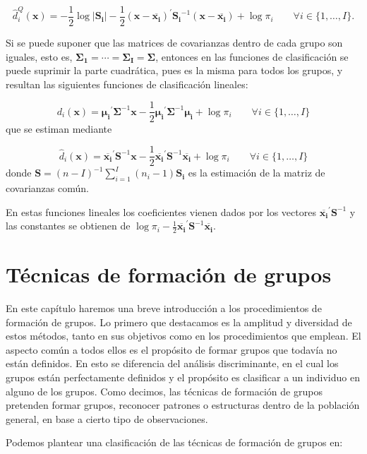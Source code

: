 \documentclass[
  a4paper,
  oneside]{scrbook}
\theoremstyle{definition}
\theoremstyle{definition}
\theoremstyle{definition}
\theoremstyle{definition}
\theoremstyle{remark}
\begin{document}
\[\hat{d}_i^Q(\bm{x})=-\frac{1}{2}\log \left|\bm{S_i}\right|
 -\frac{1}{2}\left(\bm{x}-\overline{\bm{x_{i}}}\right)^\prime{}\bm{S_i}^{-1}\left(\bm{x}-\overline{\bm{x_{i}}}\right)
+\log \pi_i\qquad\forall i\in\{1,\ldots,I\}.\]

Si se puede suponer que las matrices de covarianzas dentro de cada grupo
son iguales, esto es, \(\bm{\Sigma_1}=\cdots=\bm{\Sigma_I}=\bm\Sigma\),
entonces en las funciones de clasificación se puede suprimir la parte
cuadrática, pues es la misma para todos los grupos, y resultan las
siguientes funciones de clasificación lineales:

\[d_i(\bm{x})=\bm{\mu_i}^{\prime}\bm{\Sigma}^{-1}\bm{x}-\frac{1}{2}\bm{\mu_i}^{\prime}\bm{\Sigma}^{-1}\bm{\mu_i}+\log \pi_i
\qquad\forall i\in\{1,\ldots,I\}\] que se estiman mediante

\[\hat{d}_i(\bm{x})=\overline{\bm{x_{i}}}^{\prime}\bm{S}^{-1}\bm{x}-\frac{1}{2}\overline{\bm{x_{i}}}^{\prime}\bm{S}^{-1}\overline{\bm{x_{i}}}+\log \pi_i
\qquad\forall i\in\{1,\ldots,I\}\] donde
\(\bm{S}=(n-I)^{-1}\sum_{i=1}^I (n_i-1)\bm{S_i}\) es la estimación de la
matriz de covarianzas común.

En estas funciones lineales los coeficientes vienen dados por los
vectores \(\overline{\bm{x_{i}}}^{\prime}\bm{S}^{-1}\) y las constantes
se obtienen de
\(\log \pi_i-\frac{1}{2}\overline{\bm{x_{i}}}^{\prime}\bm{S}^{-1}\overline{\bm{x_{i}}}\).

\chapter{Técnicas de formación de grupos}\label{tecnicas-de-formacion-de-grupos}

En este capítulo haremos una breve introducción a los procedimientos de
formación de grupos. Lo primero que destacamos es la amplitud y
diversidad de estos métodos, tanto en sus objetivos como en los
procedimientos que emplean. El aspecto común a todos ellos es el
propósito de formar grupos que todavía no están definidos. En esto se
diferencia del análisis discriminante, en el cual los grupos están
perfectamente definidos y el propósito es clasificar a un individuo en
alguno de los grupos. Como decimos, las técnicas de formación de grupos
pretenden formar grupos, reconocer patrones o estructuras dentro de la
población general, en base a cierto tipo de observaciones.

Podemos plantear una clasificación de las técnicas de formación de
grupos en:
\end{document}
